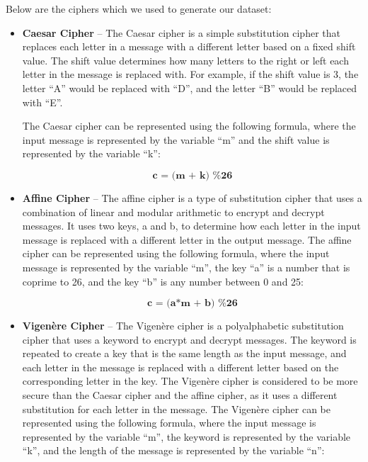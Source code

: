 \documentclass[a4paper]{article}
\begin{document}
Below are the ciphers which we used to generate our dataset:  

\begin{itemize}
    \item \textbf{Caesar Cipher} – The Caesar cipher is a simple 
    substitution cipher that replaces each letter in a message 
    with a different letter based on a fixed shift value. The 
    shift value determines how many letters to the right or 
    left each letter in the message is replaced with. For example, 
    if the shift value is 3, the letter “A” 
    would be replaced with “D”, and the letter “B” would be replaced with “E”.  


    The Caesar cipher can be represented using the following 
    formula, where the input message is represented by the variable 
    “m” and the shift value is represented by the 
    variable “k”: 

    \begin{equation} 
        \textbf{c = (m + k) \% 26}  
    \end{equation}
    
    \item \textbf{Affine Cipher} – The affine cipher is a type 
    of substitution cipher that uses a combination of linear 
    and modular arithmetic to encrypt and decrypt messages. 
    It uses two keys, a and b, to determine how each letter 
    in the input message is replaced with a different letter 
    in the output message. The affine cipher can be represented 
    using the following formula, where the input message is 
    represented by the variable “m”, the key “a” is a number 
    that is coprime to 26, and the key “b” is any number between 
    0 and 25: 

    \begin{equation}
        \textbf{c = (a*m + b) \% 26}
    \end{equation}
      
    \item \textbf{Vigenère Cipher} – The Vigenère cipher is a 
    polyalphabetic substitution cipher that uses a keyword to 
    encrypt and decrypt messages. The keyword is repeated to 
    create a key that is the same length as the input message, 
    and each letter in the message is replaced with a different 
    letter based on the corresponding letter in the key. 
    The Vigenère cipher is considered to be more secure than 
    the Caesar cipher and the affine cipher, as it uses a different 
    substitution for each letter in the message. The Vigenère 
    cipher can be represented using the following formula, where 
    the input message is represented by the variable “m”, the 
    keyword is represented by the variable “k”, and the length 
    of the message is represented by the variable “n”: 


\end{itemize}
\end{document}
